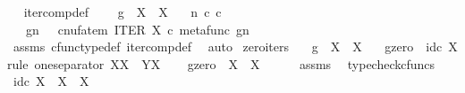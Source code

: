 \begin{isabellebody}
\endisatagproof
{\isafoldproof}%
%
\isadelimproof
\ \isanewline
%
\endisadelimproof
\isanewline
{}\isamarkupfalse%
\ iter{\isacharunderscore}{\kern0pt}comp{\isacharunderscore}{\kern0pt}def{}{\isacharcolon}{\kern0pt}\ \isanewline
\ \ \ {\isachardoublequoteopen}g\ {\isacharcolon}{\kern0pt}\ X\ {\isasymrightarrow}\ X{\isachardoublequoteclose}\isanewline
\ \ \ {\isachardoublequoteopen}n\ {\isasymin}\isactrlsub c\ {\isasymnat}\isactrlsub c{\isachardoublequoteclose}\isanewline
\ \ \ {\isachardoublequoteopen}g\isactrlbsup {\isasymcirc}n\isactrlesup \ \ {\isacharequal}{\kern0pt}\ cnufatem\ {\isacharparenleft}{\kern0pt}ITER\ X\ {\isasymcirc}\isactrlsub c\ {\isasymlangle}metafunc\ g{\isacharcomma}{\kern0pt}n{\isasymrangle}{\isacharparenright}{\kern0pt}{\isachardoublequoteclose}\isanewline
%
\isadelimproof
\ \ %
\endisadelimproof
%
\isatagproof
{}\isamarkupfalse%
\ assms\ cfunc{\isacharunderscore}{\kern0pt}type{\isacharunderscore}{\kern0pt}def\ iter{\isacharunderscore}{\kern0pt}comp{\isacharunderscore}{\kern0pt}def{}\ \isamarkupfalse%
\ auto%
\endisatagproof
{\isafoldproof}%
%
\isadelimproof
\isanewline
%
\endisadelimproof
\isanewline
{}\isamarkupfalse%
\ zero{\isacharunderscore}{\kern0pt}iters{\isacharcolon}{\kern0pt}\isanewline
\ \ \ {\isachardoublequoteopen}g\ {\isacharcolon}{\kern0pt}\ X\ {\isasymrightarrow}\ X{\isachardoublequoteclose}\isanewline
\ \ \ {\isachardoublequoteopen}g\isactrlbsup {\isasymcirc}zero\isactrlesup \ {\isacharequal}{\kern0pt}\ id\isactrlsub c\ X{\isachardoublequoteclose}\isanewline
%
\isadelimproof
%
\endisadelimproof
%
\isatagproof
{}\isamarkupfalse%
{\isacharparenleft}{\kern0pt}rule\ one{\isacharunderscore}{\kern0pt}separator{\isacharbrackleft}{\kern0pt}\ X{\isacharequal}{\kern0pt}X{\isacharcomma}{\kern0pt}\ \ Y{\isacharequal}{\kern0pt}X{\isacharbrackright}{\kern0pt}{\isacharparenright}{\kern0pt}\isanewline
\ \ \isamarkupfalse%
\ {\isachardoublequoteopen}g\isactrlbsup {\isasymcirc}zero\isactrlesup \ {\isacharcolon}{\kern0pt}\ X\ {\isasymrightarrow}\ X{\isachardoublequoteclose}\isanewline
\ \ \ \ \isamarkupfalse%
\ assms\ \isamarkupfalse%
\ typecheck{\isacharunderscore}{\kern0pt}cfuncs\isanewline
\ \ \isamarkupfalse%
\ {\isachardoublequoteopen}id\isactrlsub c\ X\ {\isacharcolon}{\kern0pt}\ X\ {\isasymrightarrow}\ X{\isachardoublequoteclose}\isanewline

\end{isabellebody}
